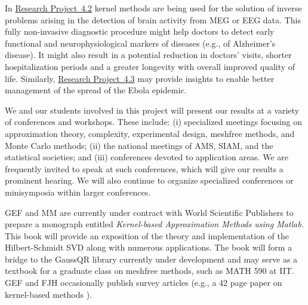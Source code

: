 \documentclass[11pt]{NSFamsart}
\newcommand{\Matlab}{{\sc Matlab}\xspace}
\newcommand{\refprobdb}{\hyperref[SectMEEG]{Research Project~4.2}\xspace}
\newcommand{\refprobdc}{\hyperref[ebolasubsec]{Research Project~4.3}\xspace}
\begin{document}
\begin{description}[leftmargin=0ex]
\item[Promoting the Well-being of Society at Large]
In \refprobdb kernel methods are being used for the solution of inverse problems arising in the detection of brain activity from MEG or EEG data. This fully non-invasive diagnostic procedure might help doctors to detect early functional and neurophysiological markers of diseases (e.g., of Alzheimer's disease). It might also result in a potential reduction in doctors' visits, shorter hospitalization periods and a greater longevity with overall improved quality of life. Similarly, \refprobdc may provide insights to enable better management of the spread of the Ebola epidemic.

\item[Organizing and Presenting at Conferences]
We and our students involved in this project will present our results at a variety of conferences and workshops.  These include: (i) specialized meetings focusing on approximation theory, complexity, experimental design, meshfree methods, and Monte Carlo methods; (ii) the national meetings of AMS, SIAM, and the statistical societies; and (iii) conferences devoted to application areas.  We are frequently invited to speak at such conferences, which will give our results a prominent hearing. We will also continue to organize specialized conferences or minisymposia within larger conferences. 

\item[Writing Textbooks and Survey Papers]
GEF and MM are currently under contract with \linebreak[4] World Scientific Publishers to prepare a monograph entitled \emph{Kernel-based Approximation Methods using \Matlab}. This book will provide an exposition of the theory and implementation of the Hilbert-Schmidt SVD along with numerous applications. The book will form a bridge to the GaussQR library \citep{McCFBG13} currently under development and may serve as a textbook for a graduate class on meshfree methods, such as MATH 590 at IIT. GEF and FJH occasionally publish survey articles (e.g., a 42 page paper on kernel-based methods \citep{Fasshauer11}).


\end{description}
\end{document}
